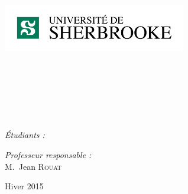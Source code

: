 \begin{center}

\begin{minipage}[t]{1.1\textwidth}
  \begin{flushright}
    \includegraphics [width=80mm,height=25mm]{images/logo_udes.png} \\[0.5cm]
  \end{flushright}
\end{minipage} \\[6cm]

\textsc{\Large \reportsubject}\\[1cm]
\HRule \\[0.25cm]
\textsc{\Large \reporttitle}
{
\HRule \\[4cm]
\begin{figure}[h]
\end{figure}
\bigbreak\bigbreak\bigbreak\bigbreak
\begin{minipage}[t]{0.3\textwidth}
  \begin{flushleft} \large
    \emph{\Large{Étudiants :}}\\ 
    \reportauthor
  \end{flushleft}
\end{minipage}
\begin{minipage}[ht]{0.6\textwidth}
  \begin{flushright} \large
    \emph{\Large{Professeur responsable :}} \\
    \Large{M.~Jean \textsc{Rouat}}
  \end{flushright}
\end{minipage}
}
\vfill

{\large Hiver 2015}

\thispagestyle{empty} %

\end{center}

